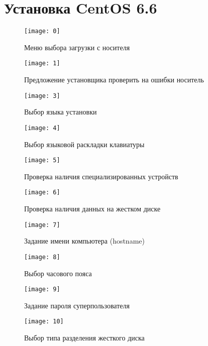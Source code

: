 \section{Установка CentOS 6.6} \label{pril:a}

\begin{figure}[ht]
    \centering
	\texttt{[image: 0]}
	\caption{Меню выбора загрузки с носителя}
\end{figure}

\begin{figure}[ht]
    \centering
	\texttt{[image: 1]}
	\caption{Предложение установщика проверить на ошибки носитель}
\end{figure}

\begin{figure}[ht]
    \centering
	\texttt{[image: 3]}
	\caption{Выбор языка установки}
\end{figure}

\begin{figure}[ht]
    \centering
	\texttt{[image: 4]}
	\caption{Выбор языковой раскладки клавиатуры}
\end{figure}

\begin{figure}[ht]
    \centering
	\texttt{[image: 5]}
	\caption{Проверка наличия специализированных устройств}
\end{figure}

\begin{figure}[ht]
    \centering
	\texttt{[image: 6]}
	\caption{Проверка наличия данных на жестком диске}
\end{figure}

\begin{figure}[ht]
    \centering
	\texttt{[image: 7]}
	\caption{Задание имени компьютера (hostname)}
\end{figure}

\begin{figure}[ht]
    \centering
	\texttt{[image: 8]}
	\caption{Выбор часового пояса}
\end{figure}

\begin{figure}[ht]
    \centering
	\texttt{[image: 9]}
	\caption{Задание пароля суперпользователя}
\end{figure}

\begin{figure}[ht]
    \centering
	\texttt{[image: 10]}
	\caption{Выбор типа разделения жесткого диска}
\end{figure}

